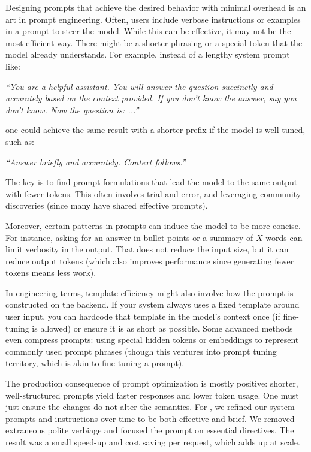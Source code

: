 Designing prompts that achieve the desired behavior with minimal overhead is an art in prompt engineering. Often, users include verbose instructions or examples in a prompt to steer the model. While this can be effective, it may not be the most efficient way. There might be a shorter phrasing or a special token that the model already understands. For example, instead of a lengthy system prompt like:

\emph{“You are a helpful assistant. You will answer the question succinctly and accurately based on the context provided. If you don’t know the answer, say you don’t know. Now the question is: ...”}

one could achieve the same result with a shorter prefix if the model is well-tuned, such as:

\emph{“Answer briefly and accurately. Context follows.”}

The key is to find prompt formulations that lead the model to the same output with fewer tokens. This often involves trial and error, and leveraging community discoveries (since many have shared effective prompts).

Moreover, certain patterns in prompts can induce the model to be more concise. For instance, asking for an answer in bullet points or a summary of $X$ words can limit verbosity in the output. That does not reduce the input size, but it can reduce output tokens (which also improves performance since generating fewer tokens means less work).

In engineering terms, template efficiency might also involve how the prompt is constructed on the backend. If your system always uses a fixed template around user input, you can hardcode that template in the model’s context once (if fine-tuning is allowed) or ensure it is as short as possible. Some advanced methods even compress prompts: using special hidden tokens or embeddings to represent commonly used prompt phrases (though this ventures into prompt tuning territory, which is akin to fine-tuning a prompt).

The production consequence of prompt optimization is mostly positive: shorter, well-structured prompts yield faster responses and lower token usage. One must just ensure the changes do not alter the semantics. For \ishtar{}, we refined our system prompts and instructions over time to be both effective and brief. We removed extraneous polite verbiage and focused the prompt on essential directives. The result was a small speed-up and cost saving per request, which adds up at scale.

